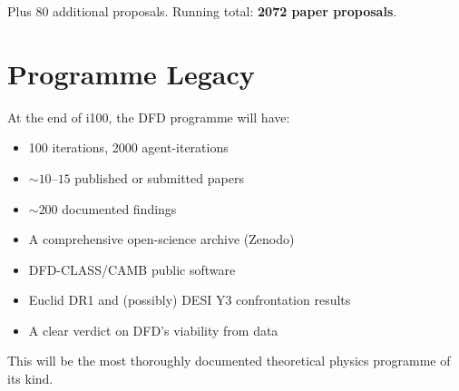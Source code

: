 \documentclass[11pt,a4paper]{article}
\begin{document}
Plus 80 additional proposals. Running total: \textbf{2072 paper proposals}.

\section{Programme Legacy}

At the end of i100, the DFD programme will have:
\begin{itemize}[nosep]
\item 100 iterations, 2000 agent-iterations
\item $\sim 10$--$15$ published or submitted papers
\item $\sim 200$ documented findings
\item A comprehensive open-science archive (Zenodo)
\item DFD-CLASS/CAMB public software
\item Euclid DR1 and (possibly) DESI Y3 confrontation results
\item A clear verdict on DFD's viability from data
\end{itemize}

This will be the most thoroughly documented theoretical physics programme of its kind.
\end{document}
